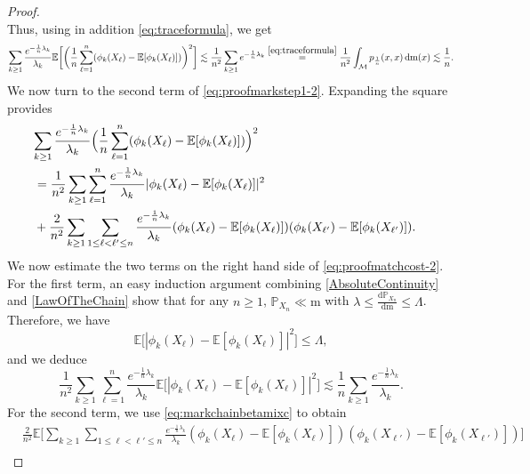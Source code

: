 \documentclass[11pt,a4paper,oneside]{amsart}
\numberwithin{equation}{section}
\newcommand{\dd}{\mathrm{d}}
\newcommand{\m}{\mathrm{m}}
\begin{document}
\begin{proof}
\[\]
Thus, using in addition \eqref{eq:traceformula}, we get
%
\begin{equation}\label{eq:proofmarkstep1-3}
\sum_{k\ge1}\frac{e^{-\frac1n\lambda_k}}{\lambda_k} \mathbb{E}\bigg[\bigg(\frac1n \sum_{\ell=1}^n (\phi_k(X_\ell) - \mathbb{E}[\phi_k(X_\ell)])\bigg)^2 \bigg] \lesssim \frac1{n^2} \sum_{k\ge1} e^{-\frac1n \lambda_k} \stackrel{\eqref{eq:traceformula}}{=} \frac1{n^2}\int_{\mathcal{M}} p_{\frac1n}(x,x)\,\dd\m(x) \lesssim \frac1n.
\end{equation}
%
We now turn to the second term of \eqref{eq:proofmarkstep1-2}. Expanding the square provides
%
\begin{equation}\label{eq:proofmatchcost-2}
\begin{split}
\lefteqn{\sum_{k \ge 1} \frac{e^{-\frac1n \lambda_k}}{\lambda_k}\Big(\frac1n \sum_{\ell=1}^n (\phi_k(X_\ell) - \mathbb{E}[\phi_k(X_\ell)])\Big)^2}\\ 
& = \frac1{n^2}\sum_{k\ge1}\sum_{\ell=1}^n \frac{e^{-\frac1n \lambda_k}}{\lambda_k} |\phi_k(X_\ell) - \mathbb{E}[\phi_k(X_\ell)]|^2 \\
& + \frac2{n^2} \sum_{k\ge1}\sum_{1\le \ell < \ell'\le n} \frac{e^{-\frac1n \lambda_k}}{\lambda_k} (\phi_k(X_\ell) - \mathbb{E}[\phi_k(X_\ell)])(\phi_k(X_{\ell'}) - \mathbb{E}[\phi_k(X_{\ell'})]).
\end{split}
\end{equation}
We now estimate the two terms on the right hand side of \eqref{eq:proofmatchcost-2}. For the first term, an easy induction argument combining \eqref{AbsoluteContinuity} and \eqref{LawOfTheChain} show that for any $n\geq 1$, $\mathbb{P}_{X_n}\ll \m$ with $\lambda\leq\frac{\dd \mathbb{P}_{X_n}}{\dd\m}\leq \Lambda$. Therefore, we have 
%
$$ \mathbb{E}\big[|\phi_k(X_\ell) - \mathbb{E}[\phi_k(X_\ell)]|^2\big]\leq \Lambda,$$
%
and we deduce
%
\begin{equation}\label{eq:proofmatchcost-3}
\frac1{n^2}\sum_{k\ge1}\sum_{\ell=1}^n \frac{e^{-\frac1n \lambda_k}}{\lambda_k} \mathbb{E}\big[|\phi_k(X_\ell) - \mathbb{E}[\phi_k(X_\ell)]|^2\big] \lesssim \frac1n \sum_{k \ge 1}  \frac{e^{-\frac1n \lambda_k}}{\lambda_k}.
\end{equation}
%
For the second term, we use \eqref{eq:markchainbetamixc} to obtain
%
\begin{align*}
&\frac2{n^2} \mathbb{E}\bigg[ \sum_{k\ge1}\sum_{1\le \ell < \ell'\le n} \frac{e^{-\frac1n \lambda_k}}{\lambda_k} (\phi_k(X_\ell) - \mathbb{E}[\phi_k(X_\ell)])(\phi_k(X_{\ell'}) - \mathbb{E}[\phi_k(X_{\ell'})])\bigg]\\

\end{align*}
\end{proof}
\end{document}

